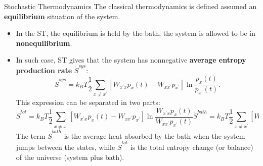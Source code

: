 \documentclass[final]{beamer}
\newlength{\colwidth}
\begin{document}
\begin{frame}[t]
\begin{columns}[t]
\begin{column}{\colwidth}
\begin{block}{Stochastic Thermodynamics}
The classical thermodynamics is defined assumed an {\bf equilibrium} situation of the system.
\begin{itemize}
\item In the ST, the equilibrium is held by the bath, the system is allowed to be in {\bf nonequilibrium}.
\item In such case, ST gives that the system has nonnegative {\bf average entropy production rate} $\dot{S}^{sys}$:
%
\begin{equation}
\dot{S}^{sys} = k_B T \frac{1}{2} \sum_{x \neq x^\prime} \left[ W_{x^\prime x} p_x(t) -  W_{x x^\prime}p_{x^\prime} \right] \ln \frac{p_x(t)}{p_{x^\prime}(t)}.
\end{equation}
%
This expression can be separated in two parts:
\begin{subequations}
\begin{equation}
\dot{S}^{tot}  = k_B T\frac{1}{2} \sum_{x \neq x^\prime} \left[ W_{x^\prime x} p_x(t) -  W_{x x^\prime}p_{x^\prime} \right] \ln \frac{W_{x^\prime x} p_x(t)}{W_{xx^\prime}p_{x^\prime}(t)}
\end{equation}
\begin{equation}
\dot{S}^{bath}  = k_B T \frac{1}{2} \sum_{x \neq x^\prime} \left[ W_{x^\prime x} p_x(t) -  W_{x x^\prime}p_{x^\prime}(t) \right] \ln \frac{W_{x^\prime x}}{W_{xx^\prime}}
\end{equation}
\end{subequations}
The term $\dot{S}^{bath}$ is the average heat absorbed by the bath when the system jumps between the states, while $\dot{S}^{tot}$ is the total entropy change (or balance) of the universe (system plus bath).


\end{itemize}
\end{block}
\end{column}
\end{columns}
\end{frame}
\end{document}
